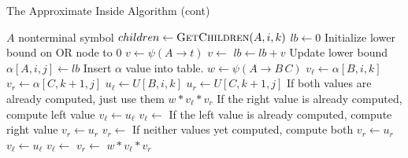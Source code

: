 \documentclass{article}
\begin{document}
\begin{algorithm}
\caption{The Approximate Inside Algorithm (cont)}
\begin{algorithmic}[2]
  \State \Comment $A$ nonterminal symbol
  \State $children \leftarrow \Call{GetChildren}{A, i, k}$
  \State $lb \leftarrow 0 $ \Comment Initialize lower bound on OR node to 0
      \State $v \leftarrow \psi(A \rightarrow t)$
      \State $v \leftarrow $\;
    \EndIf
    \State $lb \leftarrow lb + v$ \Comment Update lower bound
  \EndFor
  \State $\alpha[A, i, j] \leftarrow lb$ \Comment Insert $\alpha$ value into table.
\EndProcedure
\Statex
{}
  \State $w \leftarrow \psi(A \rightarrow B\, C)$ 
  \State $v_{\ell} \leftarrow \alpha[B, i, k]$ 
  \State $v_{r} \leftarrow \alpha[C, k+1, j]$
  \State $u_{\ell} \leftarrow U[B, i, k]$ 
  \State $u_{r} \leftarrow U[C, k+1, j]$
   \Comment If both values are already computed, just use them
    \State \Return $w * v_{\ell} * v_r$
    \Comment If the right value is already computed, compute left value
      \State $v_\ell \leftarrow u_\ell$
    \Else
      \State $v_\ell \leftarrow $\;
    \EndIf
    \Comment If the left value is already computed, compute right value
      \State $v_r \leftarrow u_r$
    \Else
      \State $v_r \leftarrow $\;
    \EndIf
  \Else \Comment If neither values yet computed, compute both
      \State $v_r \leftarrow u_r$
      \State $v_\ell \leftarrow u_\ell$
    \Else
      \State $v_\ell \leftarrow $\;
      \State $v_r \leftarrow $\;
    \EndIf
  \EndIf
  \State \Return $w * v_{\ell} * v_r$
\EndProcedure
\end{algorithmic}
\end{algorithm}
\end{document}
